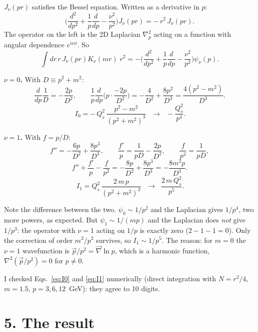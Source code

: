 \documentclass[12pt]{article}
\begin{document}
$J_\nu(pr)$ satisfies the Bessel equation. Written as a derivative in $p$:
\begin{equation}
  \Big(\frac{d^2}{dp^2} + \frac{1}{p}\frac{d}{dp} - \frac{\nu^2}{p^2}\Big) J_\nu(pr) = -\,r^2\, J_\nu(pr).
\end{equation}
The operator on the left is the 2D Laplacian $\nabla_p^2$ acting on a function with angular
dependence $e^{i\nu\phi}$. So
\begin{equation}
  \int dr\, r\, J_\nu(pr) K_\nu(mr)\; r^2 = -\Big(\frac{d^2}{dp^2} + \frac{1}{p}\frac{d}{dp} - \frac{\nu^2}{p^2}\Big)\psi_\nu(p).
\end{equation}

\textbf{$\nu=0$.} With $D\equiv p^2+m^2$:
\[
  \frac{d}{dp}\frac1D = -\frac{2p}{D^2},\qquad
  \frac1p\frac{d}{dp}\Big(p\cdot\frac{-2p}{D^2}\Big) = -\frac{4}{D^2}+\frac{8p^2}{D^3} = \frac{4(p^2-m^2)}{D^3}.
\]
\begin{equation}
  \boxed{\,I_0 = -\,Q_s^2\,\frac{p^2-m^2}{(p^2+m^2)^3}\,}\;\;\longrightarrow\;\; -\frac{Q_s^2}{p^4}.
  \label{eq:I0}
\end{equation}

\textbf{$\nu=1$.} With $f=p/D$:
\[
  f'' = -\frac{6p}{D^2}+\frac{8p^3}{D^3},\qquad \frac{f'}{p} = \frac{1}{pD}-\frac{2p}{D^2},\qquad \frac{f}{p^2}=\frac{1}{pD},
\]
\[
  f''+\frac{f'}{p}-\frac{f}{p^2} = -\frac{8p}{D^2}+\frac{8p^3}{D^3} = -\frac{8m^2p}{D^3}.
\]
\begin{equation}
  \boxed{\,I_1 = Q_s^2\,\frac{2\,m\,p}{(p^2+m^2)^3}\,}\;\;\longrightarrow\;\; \frac{2\,m\,Q_s^2}{p^5}.
  \label{eq:I1}
\end{equation}

Note the difference between the two. $\psi_0\sim 1/p^2$ and the Laplacian gives $1/p^4$, two more
powers, as expected. But $\psi_1\sim 1/(mp)$ and the Laplacian does \emph{not} give $1/p^3$: the
operator with $\nu=1$ acting on $1/p$ is exactly zero ($2-1-1=0$). Only the correction of order
$m^2/p^2$ survives, so $I_1\sim 1/p^5$. The reason: for $m=0$ the $\nu=1$ wavefunction is
$\vec p/p^2=\vec\nabla\ln p$, which is a harmonic function, $\nabla^2(\vec p/p^2)=0$ for $p\neq0$.

I checked Eqs.~\eqref{eq:I0} and \eqref{eq:I1} numerically (direct integration with $N=r^2/4$,
$m=1.5$, $p=3,6,12$~GeV): they agree to 10 digits.

\section*{5. The result}
\end{document}
